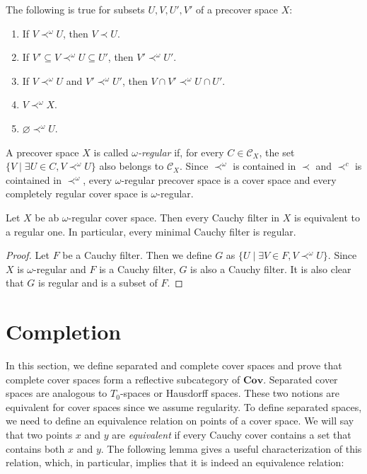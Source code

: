 \documentclass[reqno]{amsart}
\theoremstyle{definition}
\theoremstyle{remark}
\numberwithin{figure}{section}
\newcommand{\rb}{\prec}
\newcommand{\cat}[1]{\mathbf{#1}}
\begin{document}
\begin{prop}
The following is true for subsets $U,V,U',V'$ of a precover space $X$:
\begin{enumerate}
\item If $V \rb^\omega U$, then $V \rb U$.
\item If $V' \subseteq V \rb^\omega U \subseteq U'$, then $V' \rb^\omega U'$.
\item If $V \rb^\omega U$ and $V' \rb^\omega U'$, then $V \cap V' \rb^\omega U \cap U'$.
\item $V \rb^\omega X$.
\item $\varnothing \rb^\omega U$.
\end{enumerate}
\end{prop}

A precover space $X$ is called \emph{$\omega$-regular} if, for every $C \in \mathcal{C}_X$, the set $\{ V \mid \exists U \in C, V \rb^\omega U \}$ also belongs to $\mathcal{C}_X$.
Since $\rb^\omega$ is contained in $\rb$ and $\rb^c$ is cointained in $\rb^\omega$, every $\omega$-regular precover space is a cover space and every completely regular cover space is $\omega$-regular.

\begin{prop}
Let $X$ be ab $\omega$-regular cover space.
Then every Cauchy filter in $X$ is equivalent to a regular one.
In particular, every minimal Cauchy filter is regular.
\end{prop}
\begin{proof}
Let $F$ be a Cauchy filter.
Then we define $G$ as $\{ U \mid \exists V \in F, V \rb^\omega U \}$.
Since $X$ is $\omega$-regular and $F$ is a Cauchy filter, $G$ is also a Cauchy filter.
It is also clear that $G$ is regular and is a subset of $F$.
\end{proof}

\section{Completion}

In this section, we define separated and complete cover spaces and prove that complete cover spaces form a reflective subcategory of $\cat{Cov}$.
Separated cover spaces are analogous to $T_0$-spaces or Hausdorff spaces.
These two notions are equivalent for cover spaces since we assume regularity.
To define separated spaces, we need to define an equivalence relation on points of a cover space.
We will say that two points $x$ and $y$ are \emph{equivalent} if every Cauchy cover contains a set that contains both $x$ and $y$.
The following lemma gives a useful characterization of this relation, which, in particular, implies that it is indeed an equivalence relation:
\end{document}
